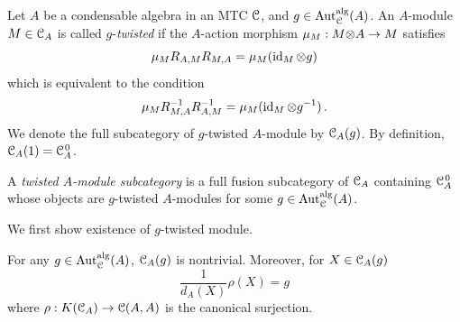 \documentclass{amsart}
\begin{document}
\begin{defn} Let $A$ be a condensable algebra in an MTC ${\EuScript{C}}$, and $g \in {\operatorname{Aut}_{\EuScript{C}}^{\operatorname{alg}}}(A)$.
    An $A$-module $M \in {{\EuScript{C}}_A}$ is called  $g$-\emph{twisted} if the $A$-action morphism $\mu_M: M {\otimes} A \to M$ satisfies
$$
\mu_M R_{A,M} R_{M,A} = \mu_M(\operatorname{id}_M {\otimes} g)
$$
which is equivalent to the condition
$$
\mu_M R_{M,A}^{-1} R_{A,M}^{-1} = \mu_M(\operatorname{id}_M {\otimes} g^{-1})\,.
$$
We denote the full subcategory of $g$-twisted $A$-module by ${{\EuScript{C}}_A}(g)$. By definition, ${{\EuScript{C}}_A}(1) = {{\EuScript{C}}_A^{\hspace{1pt}0}}$. 

A \emph{twisted $A$-module subcategory}   is a full fusion subcategory of  ${{\EuScript{C}}_A}$  containing ${{\EuScript{C}}_A^{\hspace{1pt}0}}$ whose objects are $g$-twisted $A$-modules for some $g \in {\operatorname{Aut}_{\EuScript{C}}^{\operatorname{alg}}}(A)$.
\end{defn}
We first show existence of $g$-twisted module. 
\begin{lem}\label{l:nontrivial}
    For any $g \in {\operatorname{Aut}_{\EuScript{C}}^{\operatorname{alg}}}(A)$, ${{\EuScript{C}}_A}(g)$ is nontrivial. Moreover, for $X \in {{\EuScript{C}}_A}(g)$
    $$
    \frac{1}{d_A(X)} \rho(X) = g
    $$
    where  $\rho: K({{\EuScript{C}}_A}) \to {\EuScript{C}}(A,A)$ is the canonical surjection.
\end{lem}
\end{document}
